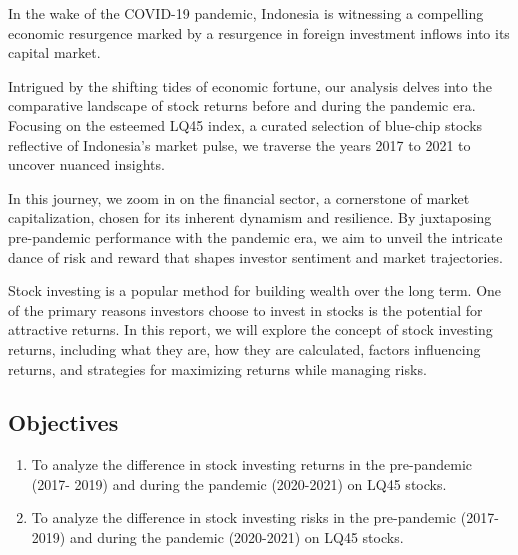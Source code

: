 
\par

In the wake of the COVID-19 pandemic, Indonesia is witnessing a compelling economic resurgence marked by a resurgence in foreign investment inflows into its capital market.

Intrigued by the shifting tides of economic fortune, our analysis delves into the comparative landscape of stock returns before and during the pandemic era. Focusing on the esteemed LQ45 index, a curated selection of blue-chip stocks reflective of Indonesia's market pulse, we traverse the years 2017 to 2021 to uncover nuanced insights.

In this journey, we zoom in on the financial sector, a cornerstone of market capitalization, chosen for its inherent dynamism and resilience. By juxtaposing pre-pandemic performance with the pandemic era, we aim to unveil the intricate dance of risk and reward that shapes investor sentiment and market trajectories.

Stock investing is a popular method for building wealth over the long term. One of the primary reasons investors choose to invest in stocks is the potential for attractive returns. In this report, we will explore the concept of stock investing returns, including what they are, how they are calculated, factors influencing returns, and strategies for maximizing returns while managing risks.

\subsection{Objectives}
\begin{enumerate}
    \item To analyze the difference in stock investing returns in the pre-pandemic (2017-
2019) and during the pandemic (2020-2021) on LQ45 stocks.
    \item To analyze the difference in stock investing risks in the pre-pandemic (2017-
2019) and during the pandemic (2020-2021) on LQ45 stocks.
\end{enumerate}






